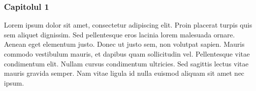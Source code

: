 \maketitle \begin{frame} 
\frametitle{Capitolul 1} 
Lorem ipsum dolor sit amet, consectetur adipiscing elit. Proin placerat turpis quis sem aliquet dignissim. Sed pellentesque eros lacinia lorem malesuada ornare. Aenean eget elementum justo. Donec ut justo sem, non volutpat sapien. Mauris commodo vestibulum mauris, et dapibus quam sollicitudin vel. Pellentesque vitae condimentum elit. Nullam cursus condimentum ultricies. Sed sagittis lectus vitae mauris gravida semper. Nam vitae ligula id nulla euismod aliquam sit amet nec ipsum.

\end{frame} 
